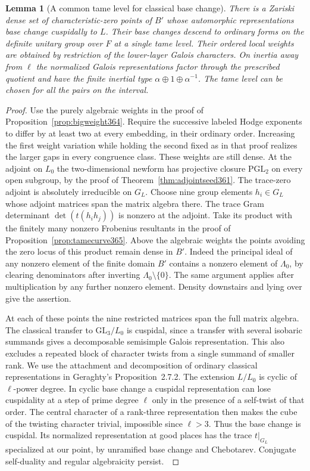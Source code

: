 \documentclass[a4paper,11pt]{article}
\newtheorem{lemma}[proposition]{Lemma}
\theoremstyle{definition}
\theoremstyle{remark}
\numberwithin{equation}{section}
\begin{document}
\begin{lemma}[A common tame level for classical base change]
\label{lem:bcpoints371}
There is a Zariski dense set of characteristic-zero points
of \(B'\) whose automorphic representations base change
cuspidally to \(L\). Their base changes descend to ordinary
forms on the definite unitary group over \(F\) at a single
tame level. Their ordered local weights are obtained by
restriction of the lower-layer Galois characters. On inertia
away from \(\ell\) the normalized Galois representations
factor through the prescribed quotient and have the finite
inertial type \(\alpha\oplus1\oplus\alpha^{-1}\). The tame
level can be chosen for all the pairs on the interval.
\end{lemma}
\begin{proof}
Use the purely algebraic weights in the proof of
Proposition~\ref{prop:bigweight364}. Require the successive
labeled Hodge exponents to differ by at least two at every
embedding, in their ordinary order. Increasing the first
weight variation while holding the second fixed as in that
proof realizes the larger gaps in every congruence class.
These weights are still dense. At the adjoint on \(L_0\)
the two-dimensional newform has projective closure
\(\mathrm{PGL}_2\) on every open subgroup, by the proof of
Theorem~\ref{thm:adjointseed361}. The trace-zero adjoint
is absolutely irreducible on \(G_L\). Choose nine group
elements \(h_i\in G_L\) whose adjoint matrices span the
matrix algebra there. The trace Gram determinant
\(\det(t(h_i h_j))\) is nonzero at the adjoint. Take its
product with the finitely many nonzero Frobenius resultants
in the proof of Proposition~\ref{prop:tamecurve365}.
Above the algebraic weights the points avoiding the zero
locus of this product remain dense in \(B'\). Indeed the
principal ideal of any nonzero element of the finite domain
\(B'\) contains a nonzero element of \(\Lambda_0\), by clearing
denominators after inverting \(\Lambda_0\setminus\{0\}\).
The same argument applies after multiplication by any
further nonzero element. Density downstairs and lying over
give the assertion.

At each of these points the nine restricted matrices span
the full matrix algebra. The classical transfer to
\(\mathrm{GL}_3/L_0\) is cuspidal, since a transfer with
several isobaric summands gives a decomposable semisimple
Galois representation. This also excludes a repeated block
of character twists from a single summand of smaller rank.
We use the attachment and decomposition of ordinary classical
representations in Geraghty's Proposition~2.7.2.
The extension \(L/L_0\) is cyclic of \(\ell\)-power degree.
In cyclic base change a cuspidal representation can lose
cuspidality at a step of prime degree \(\ell\) only in the
presence of a self-twist of that order. The central character
of a rank-three representation then makes the cube of the
twisting character trivial, impossible since \(\ell>3\).
Thus the base change is cuspidal. Its normalized representation
at good places has the trace \(t|_{G_L}\) specialized at our
point, by unramified base change and Chebotarev. Conjugate
self-duality and regular algebraicity persist.~\cite{VII-V-geraghty363,VII-V-I-ac123}


\end{proof}
\end{document}
